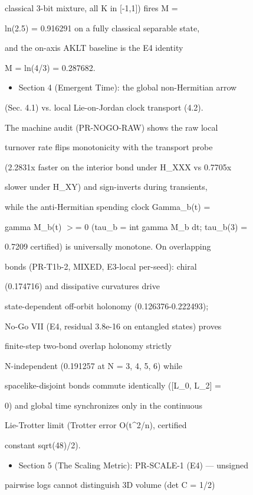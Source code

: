 \documentclass[11pt,a4paper]{article}
\theoremstyle{definition}
\begin{document}
    classical 3-bit mixture, all K in [-1,1]) fires M =

    ln(2.5) = 0.916291 on a fully classical separable state,

    and the on-axis AKLT baseline is the E4 identity

    M = ln(4/3) = 0.287682.

\begin{itemize}[leftmargin=1.4em]
\item Section 4 (Emergent Time): the global non-Hermitian arrow
\end{itemize}
    (Sec. 4.1) vs. local Lie-on-Jordan clock transport (4.2).

    The machine audit (PR-NOGO-RAW) shows the raw local

    turnover rate flips monotonicity with the transport probe

    (2.2831x faster on the interior bond under H\_XXX vs 0.7705x

    slower under H\_XY) and sign-inverts during transients,

    while the anti-Hermitian spending clock Gamma\_b(t) =

    gamma M\_b(t) $>$= 0 (tau\_b = int gamma M\_b dt; tau\_b(3) =

    0.7209 certified) is universally monotone. On overlapping

    bonds (PR-T1b-2, MIXED, E3-local per-seed): chiral

    (0.174716) and dissipative curvatures drive

    state-dependent off-orbit holonomy (0.126376-0.222493);

    No-Go VII (E4, residual 3.8e-16 on entangled states) proves

    finite-step two-bond overlap holonomy strictly

    N-independent (0.191257 at N = 3, 4, 5, 6) while

    spacelike-disjoint bonds commute identically ([L\_0, L\_2] =

    0) and global time synchronizes only in the continuous

    Lie-Trotter limit (Trotter error O(t\^{}2/n), certified

    constant sqrt(48)/2).

\begin{itemize}[leftmargin=1.4em]
\item Section 5 (The Scaling Metric): PR-SCALE-1 (E4) — unsigned
\end{itemize}
    pairwise logs cannot distinguish 3D volume (det C = 1/2)
\end{document}
